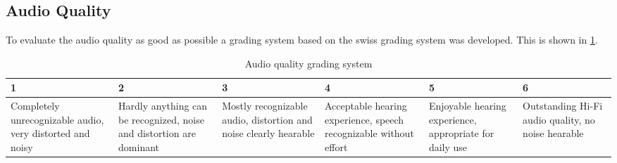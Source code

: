 \subsection{Audio Quality}
To evaluate the audio quality as good as possible a grading system based on the swiss grading system was developed. This is shown in \ref{6.1.2_tab:audio_quality}.

\begin{center}
\begin{table}
\centering
\begin{tabular}{ |m{2.2cm}|m{2.2cm}|m{2.2cm}|m{2.2cm}|m{2.2cm}|m{2.2cm}|}
  \hline 
  1 & 2 & 3 & 4 & 5 & 6\\ 
  \hline
 Completely unrecognizable audio, very distorted and noisy & Hardly anything can be recognized, noise and distortion are dominant & Mostly recognizable audio, distortion and noise clearly hearable &  Acceptable hearing experience, speech recognizable without effort & Enjoyable hearing experience, appropriate for daily use &  Outstanding Hi-Fi audio quality, no noise hearable \\
 \hline
\end{tabular}
\caption{Audio quality grading system}
\label{6.1.2_tab:audio_quality}
\end{table}
\end{center}

